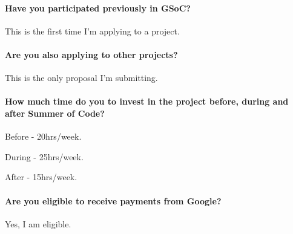       
\paragraph*{Have you participated previously in GSoC? \\} \vspace*{-0.2cm}
    \vspace*{0.1cm}
    This is the first time I'm applying to a project.
\paragraph*{Are you also applying to other projects? \\} \vspace*{-0.2cm}
    \vspace*{0.1cm}
    This is the only proposal I'm submitting.
\paragraph*{How much time do you to invest in the project before, during and after Summer of Code? \\} \vspace*{-0.2cm}
    \vspace*{0.1cm}
    \begin{focus}
        \item Before - 20hrs/week.
        \item During - 25hrs/week.
        \item After - 15hrs/week.
    \end{focus}

\paragraph*{Are you eligible to receive payments from Google? \\} \vspace*{-0.2cm}
    \vspace*{0.1cm}
    Yes, I am eligible.
